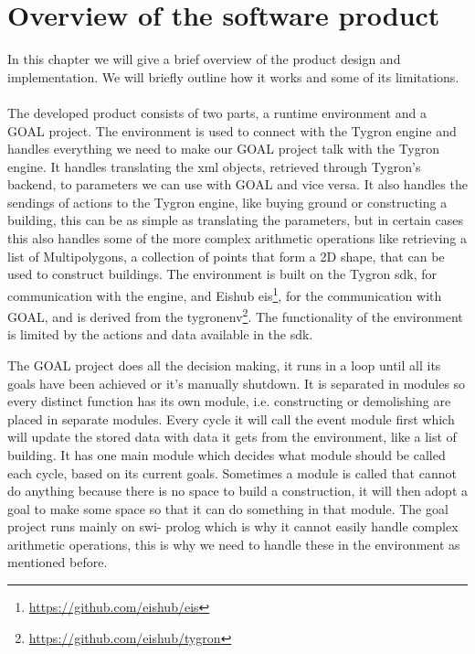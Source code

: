 \section{Overview of the software product}\label{sec:overview}
In this chapter we will give a brief overview of the product design and implementation. We will briefly outline how it works and some of its limitations.
\\
\\
The developed product consists of two parts, a runtime environment and a GOAL project.
The environment is used to connect with the Tygron engine and handles everything we need to make our GOAL project talk with the Tygron engine.
It handles translating the xml objects, retrieved through Tygron's backend, to parameters we can use with GOAL and vice versa.
It also handles the sendings of actions to the Tygron engine, like buying ground or constructing a building, this can be as simple as translating the parameters, but in certain cases this also handles some of the more complex arithmetic operations like retrieving a list of Multipolygons, a collection of points that form a 2D shape, that can be used to construct buildings.
The environment is built on the Tygron sdk, for communication with the engine, and Eishub eis\footnote{\url{https://github.com/eishub/eis}}, for the communication with GOAL, and is derived from the tygronenv\footnote{\url{https://github.com/eishub/tygron}}.
The functionality of the environment is limited by the actions and data available in the sdk.

The GOAL project does all the decision making, it runs in a loop until all its goals have been achieved or it's manually shutdown.
It is separated in modules so every distinct function has its own module, i.e. constructing or demolishing are placed in separate modules.
Every cycle it will call the event module first which will update the stored data with data it gets from the environment, like a list of building.
It has one main module which decides what module should be called each cycle, based on its current goals.
Sometimes a module is called that cannot do anything because there is no space to build a construction, it will then adopt a goal to make some space so that it can do something in that module.
The goal project runs mainly on swi- prolog which is why it cannot easily handle complex arithmetic operations, this is why we need to handle these in the environment as mentioned before.
